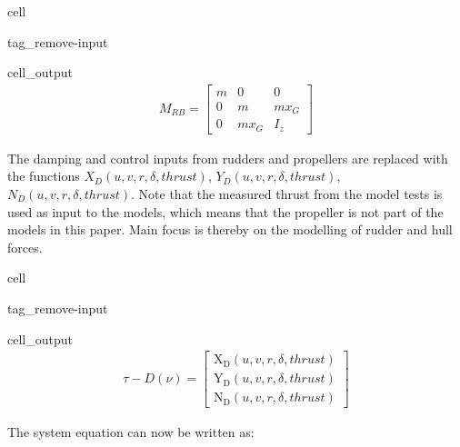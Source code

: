 \documentclass[review]{elsarticle}
\begin{document}
\begin{sphinxuseclass}{cell}
\begin{sphinxuseclass}{tag_remove-input}
\begin{sphinxuseclass}{cell_output}\begin{equation*}
\begin{split}\displaystyle M_{RB} = \left[\begin{matrix}m & 0 & 0\\0 & m & m x_{G}\\0 & m x_{G} & I_{z}\end{matrix}\right]\end{split}
\end{equation*}
\end{sphinxuseclass}
\end{sphinxuseclass}
\end{sphinxuseclass}
\sphinxAtStartPar
The damping and control inputs from rudders and propellers are replaced with the functions \(X_D(u,v,r,\delta,thrust)\), \(Y_D(u,v,r,\delta,thrust)\), \(N_D(u,v,r,\delta,thrust)\). Note that the measured thrust from the model tests is used as input to the models, which means that the propeller is not part of the models in this paper. Main focus is thereby on the modelling of rudder and hull forces.

\begin{sphinxuseclass}{cell}
\begin{sphinxuseclass}{tag_remove-input}
\begin{sphinxuseclass}{cell_output}\begin{equation*}
\begin{split}\displaystyle \tau - D{\left(\nu \right)} = \left[\begin{matrix}\operatorname{X_{D}}{\left(u,v,r,\delta,thrust \right)}\\\operatorname{Y_{D}}{\left(u,v,r,\delta,thrust \right)}\\\operatorname{N_{D}}{\left(u,v,r,\delta,thrust \right)}\end{matrix}\right]\end{split}
\end{equation*}
\end{sphinxuseclass}
\end{sphinxuseclass}
\end{sphinxuseclass}
\sphinxAtStartPar
The system equation can now be written as:
\end{document}
